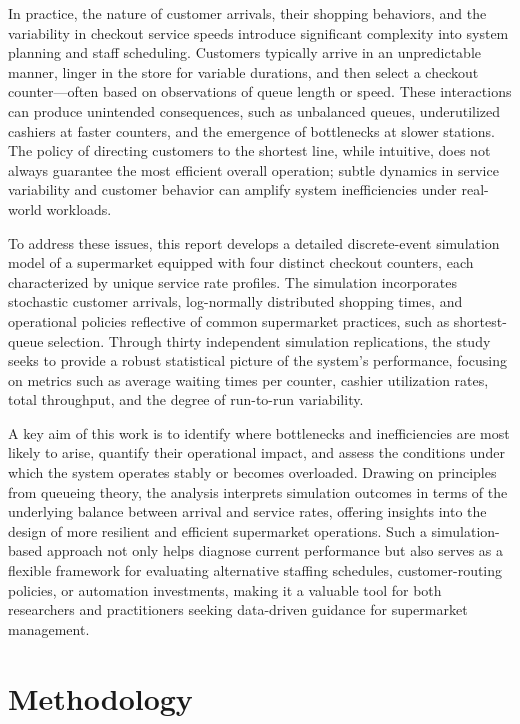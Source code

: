\documentclass[
]{article}
\begin{document}
In practice, the nature of customer arrivals, their shopping behaviors,
and the variability in checkout service speeds introduce significant
complexity into system planning and staff scheduling. Customers
typically arrive in an unpredictable manner, linger in the store for
variable durations, and then select a checkout counter---often based on
observations of queue length or speed. These interactions can produce
unintended consequences, such as unbalanced queues, underutilized
cashiers at faster counters, and the emergence of bottlenecks at slower
stations. The policy of directing customers to the shortest line, while
intuitive, does not always guarantee the most efficient overall
operation; subtle dynamics in service variability and customer behavior
can amplify system inefficiencies under real-world workloads.

To address these issues, this report develops a detailed discrete-event
simulation model of a supermarket equipped with four distinct checkout
counters, each characterized by unique service rate profiles. The
simulation incorporates stochastic customer arrivals, log-normally
distributed shopping times, and operational policies reflective of
common supermarket practices, such as shortest-queue selection. Through
thirty independent simulation replications, the study seeks to provide a
robust statistical picture of the system's performance, focusing on
metrics such as average waiting times per counter, cashier utilization
rates, total throughput, and the degree of run-to-run variability.

A key aim of this work is to identify where bottlenecks and
inefficiencies are most likely to arise, quantify their operational
impact, and assess the conditions under which the system operates stably
or becomes overloaded. Drawing on principles from queueing theory, the
analysis interprets simulation outcomes in terms of the underlying
balance between arrival and service rates, offering insights into the
design of more resilient and efficient supermarket operations. Such a
simulation-based approach not only helps diagnose current performance
but also serves as a flexible framework for evaluating alternative
staffing schedules, customer-routing policies, or automation
investments, making it a valuable tool for both researchers and
practitioners seeking data-driven guidance for supermarket management.

\newpage
    \centering

\section{Methodology}\label{methodology}
\end{document}
